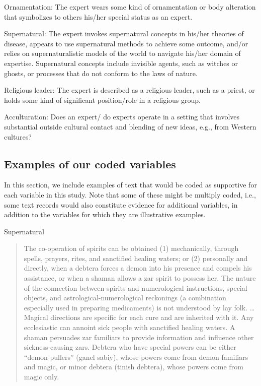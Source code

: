 \documentclass[
]{article}
\begin{document}
Ornamentation: The expert wears some kind of ornamentation or body alteration that symbolizes to others his/her special status as an expert.

Supernatural: The expert invokes supernatural concepts in his/her theories of disease, appears to use supernatural methods to achieve some outcome, and/or relies on supernaturalistic models of the world to navigate his/her domain of expertise. Supernatural concepts include invisible agents, such as witches or ghosts, or processes that do not conform to the laws of nature.

Religious leader: The expert is described as a religious leader, such as a priest, or holds some kind of significant position/role in a religious group.

Acculturation: Does an expert/ do experts operate in a setting that involves substantial outside cultural contact and blending of new ideas, e.g., from Western cultures?

\hypertarget{examples-of-our-coded-variables}{%
\subsection{Examples of our coded variables}\label{examples-of-our-coded-variables}}

In this section, we include examples of text that would be coded as supportive for each variable in this study. Note that some of these might be multiply coded, i.e., some text records would also constitute evidence for additional variables, in addition to the variables for which they are illustrative examples.

Supernatural

\begin{quote}
The co-operation of spirits can be obtained (1) mechanically, through spells, prayers, rites, and sanctified healing waters; or (2) personally and directly, when a debtera forces a demon into his presence and compels his assistance, or when a shaman allows a zar spirit to possess her. The nature of the connection between spirits and numerological instructions, special objects, and astrological-numerological reckonings (a combination especially used in preparing medicaments) is not understood by lay folk. \ldots{} Magical directions are specific for each cure and are inherited with it. Any ecclesiastic can annoint sick people with sanctified healing waters. A shaman persuades zar familiars to provide information and influence other sickness-causing zars. Debtera who have special powers can be either ``demon-pullers'' (ganel sabiy), whose powers come from demon familiars and magic, or minor debtera (tinish debtera), whose powers come from magic only.
\end{quote}
\end{document}
